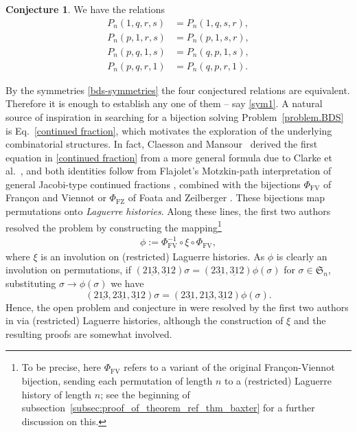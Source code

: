 \documentclass[12pt,reqno]{amsart}
\numberwithin{equation}{section}
\theoremstyle{plain}
\theoremstyle{definition}
\newtheorem{conjecture}[theorem]{Conjecture}
\def\Sym{\mathfrak{S}}
\def\FV{\mathrm{FV}}
\def\FZ{\mathrm{FZ}}
\def\rasc{\mathrm{2\underline{13}}}
\def\rdes{\mathrm{2\underline{31}}}
\def\ldes{\mathrm{\underline{31}2}}
\begin{document}
\begin{conjecture}\label{conj:tri-variate}
We have the relations
\begin{align}
P_n(1,q,r,s)&=P_n(1, q, s,r),\label{sym1}\\
P_n(p,1,r,s)&=P_n(p,1, s,r),\nonumber \\
P_n(p,q,1,s)&=P_n(q,p, 1,s),\nonumber \\
P_n(p,q,r,1)&=P_n(q,p, r,1).\nonumber
\end{align}
\end{conjecture}
By the symmetries \eqref{bds-symmetries} the four conjectured relations are equivalent. Therefore it is enough to establish any one of them -- say \eqref{sym1}. 
 A natural source of inspiration in searching for a bijection solving  Problem~\ref{problem.BDS} is Eq.~\eqref{continued fraction}, which motivates the exploration of the underlying combinatorial structures. In fact,  
 Claesson and Mansour~\cite{CM02} derived the first equation in \eqref{continued fraction} 
from a more general formula due to Clarke et al.~\cite{CSZ97}, and 
 both identities follow from Flajolet's Motzkin-path interpretation of general Jacobi-type continued fractions \cite{Fl80}, combined with the bijections $\Phi_{\FV}$ of Fran\c con and Viennot \cite{FV79}  or  $\Phi_{\FZ}$ of Foata and Zeilberger \cite{FZ90}. 
These bijections map permutations onto \emph{Laguerre histories}. Along these lines, the first two authors~\cite[Corollary 4.5]{CF23} resolved the problem by constructing the mapping\footnote{To be precise, here $\Phi_{\FV}$ refers to a variant of the original Fran\c con-Viennot bijection, sending each permutation of length $n$ to a (restricted) Laguerre history of length $n$; see the beginning of subsection~\ref{subsec:proof_of_theorem_ref_thm_baxter} for a further discussion on this.}
\begin{align}\label{def:phi}
\phi := \Phi^{-1}_{\FV} \circ \xi \circ \Phi_{\FV},
\end{align}
where $\xi$ is an involution on (restricted)  Laguerre histories.
As $\phi$ is clearly an involution on permutations,  if 
$(\rasc, \ldes)\sigma= (\rdes, \ldes)\phi(\sigma)$  for $\sigma\in \Sym_n$,  substituting 
$\sigma\to \phi(\sigma)$ we have 
\begin{equation}
(\rasc,\rdes, \ldes)\sigma= (\rdes, \rasc, \ldes)\phi(\sigma).
\end{equation}
Hence, the open problem and conjecture in \cite{BDS24} were resolved by the first two authors in \cite{CF23} via (restricted)  Laguerre histories, although the construction of $\xi$ and the resulting proofs are somewhat involved.  
  
\end{document}
